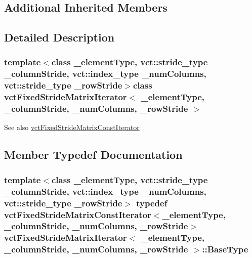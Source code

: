 \subsection*{Additional Inherited Members}


\subsection{Detailed Description}
\subsubsection*{template$<$class \+\_\+element\+Type, vct\+::stride\+\_\+type \+\_\+column\+Stride, vct\+::index\+\_\+type \+\_\+num\+Columns, vct\+::stride\+\_\+type \+\_\+row\+Stride$>$class vct\+Fixed\+Stride\+Matrix\+Iterator$<$ \+\_\+element\+Type, \+\_\+column\+Stride, \+\_\+num\+Columns, \+\_\+row\+Stride $>$}

\begin{DoxySeeAlso}{See also}
\hyperlink{classvct_fixed_stride_matrix_const_iterator}{vct\+Fixed\+Stride\+Matrix\+Const\+Iterator} 
\end{DoxySeeAlso}


\subsection{Member Typedef Documentation}
\hypertarget{classvct_fixed_stride_matrix_iterator_a9711a47a94c8d65a5f91c5064914f326}{}
\subsubsection[{Base\+Type}]{\setlength{\rightskip}{0pt plus 5cm}template$<$class \+\_\+element\+Type, vct\+::stride\+\_\+type \+\_\+column\+Stride, vct\+::index\+\_\+type \+\_\+num\+Columns, vct\+::stride\+\_\+type \+\_\+row\+Stride$>$ typedef {\bf vct\+Fixed\+Stride\+Matrix\+Const\+Iterator}$<$\+\_\+element\+Type, \+\_\+column\+Stride, \+\_\+num\+Columns, \+\_\+row\+Stride$>$ {\bf vct\+Fixed\+Stride\+Matrix\+Iterator}$<$ \+\_\+element\+Type, \+\_\+column\+Stride, \+\_\+num\+Columns, \+\_\+row\+Stride $>$\+::{\bf Base\+Type}}\label{classvct_fixed_stride_matrix_iterator_a9711a47a94c8d65a5f91c5064914f326}
\hypertarget{classvct_fixed_stride_matrix_iterator_aa33a65dee36b4ac1f9fb5479ce074742}{}
